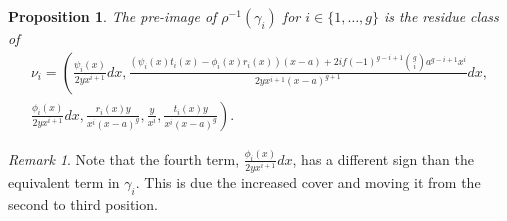 \documentclass[draft, 11pt]{article} %
\theoremstyle{plain}
\newtheorem{prop}[defn]{Proposition}
\theoremstyle{remark}
\newtheorem*{rem}{Remark}
\begin{document}
\begin{prop}\label{basis22}
The pre-image of $\rho^{-1}(\gamma_i)$ for $i \in \{1, \ldots, g\}$ is the residue class of
\begin{multline*}
\nu_i = \left(\frac{\psi_i(x)}{2yx^{i+1}}dx, \frac{(\psi_i(x)t_i(x) - \phi_i(x)r_i(x))(x-a) + 2if(-1)^{g-i+1}\binom{g}{i} a^{g-i+1}x^i}{2yx^{i+1}(x-a)^{g+1}}dx,\right. \\\left. \frac{\phi_i(x)}{2yx^{i+1}}dx,  \frac{r_i(x)y}{x^i(x-a)^g}, \frac{y}{x^i},  \frac{t_i(x)y}{x^i(x-a)^g} \right).
\end{multline*}
\end{prop}
\begin{rem}
Note that the fourth term, $\frac{\phi_i(x)}{2yx^{i+1}} dx$, has a different sign than the equivalent term in $\gamma_i$.
This is due the increased cover and moving it from the second to third position.
\end{rem}
\end{document}
